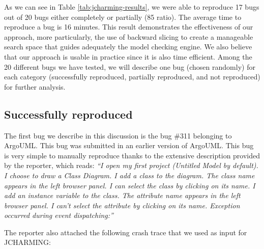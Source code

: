\documentclass[times]{smrauth}
\begin{document}
As we can see in Table \ref{tab:jcharming-results}, we were able to reproduce 17 bugs
out of 20 bugs either completely or partially (85%
ratio). The average time to reproduce a bug is 16 minutes.
This result demonstrates the effectiveness of our approach,
more particularly, the use of backward slicing to create a
manageable search space that guides adequately the model
checking engine. We also believe that our approach is usable
in practice since it is also time efficient. Among the 20 different bugs we have tested, we will describe
one bug (chosen randomly) for each category (successfully
reproduced, partially reproduced, and not reproduced) for
further analysis.

\subsection{Successfully reproduced}

The first bug we describe in this discussion is the bug \#311
belonging to ArgoUML. This bug was submitted in an earlier
version of ArgoUML. This bug is very simple to manually
reproduce thanks to the extensive description provided by the
reporter, which reads: {\it ``I open my first project (Untitled Model by default). I choose
to draw a Class Diagram. I add a class to the diagram. The
class name appears in the left browser panel. I can select the
class by clicking on its name. I add an instance variable to the
class. The attribute name appears in the left browser panel. I
can't select the attribute by clicking on its name. Exception
occurred during event dispatching:''}

The reporter also attached the following crash trace that we
used as input for JCHARMING:
\end{document}
